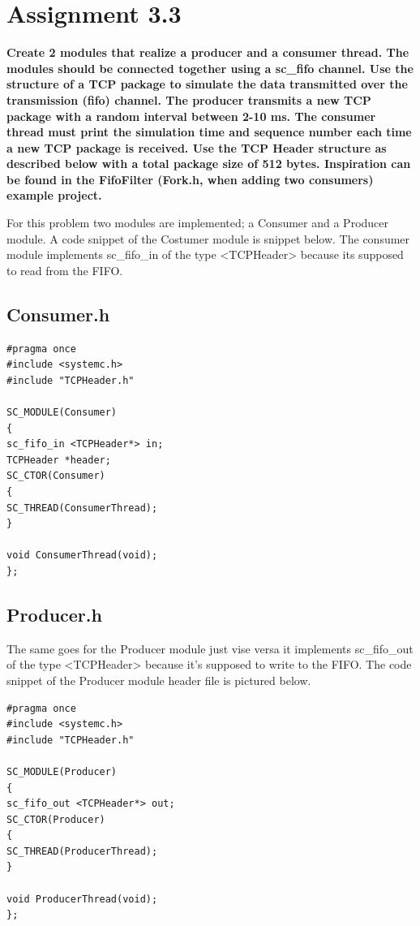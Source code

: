 
\chapter{Assignment 3.3}

\textbf{Create 2 modules that realize a producer and a consumer thread. The modules should be
	connected together using a sc\_fifo channel. Use the structure of a TCP package to simulate the
	data transmitted over the transmission (fifo) channel. The producer transmits a new TCP package
	with a random interval between 2-10 ms. The consumer thread must print the simulation time and
	sequence number each time a new TCP package is received. Use the TCP Header structure as
	described below with a total package size of 512 bytes. Inspiration can be found in the FifoFilter
	(Fork.h, when adding two consumers) example project.
}

For this problem two modules are implemented; a Consumer and a Producer module. 
A code snippet of the Costumer module is snippet below. 
The consumer module implements sc\_fifo\_in of the type <TCPHeader> because its supposed to read from the FIFO.

\section{Consumer.h}
\begin{lstlisting}
#pragma once
#include <systemc.h>
#include "TCPHeader.h"

SC_MODULE(Consumer)
{
sc_fifo_in <TCPHeader*> in;
TCPHeader *header;
SC_CTOR(Consumer)
{
SC_THREAD(ConsumerThread);
}

void ConsumerThread(void);
};
\end{lstlisting}


\section{Producer.h}
The same goes for the Producer module just vise versa it implements sc\_fifo\_out of the type <TCPHeader> because it’s supposed to write to the FIFO. The code snippet of the Producer module header file is pictured below.
\begin{lstlisting}
#pragma once
#include <systemc.h>
#include "TCPHeader.h"

SC_MODULE(Producer)
{
sc_fifo_out <TCPHeader*> out;
SC_CTOR(Producer)
{
SC_THREAD(ProducerThread);
}

void ProducerThread(void);
};
\end{lstlisting}





